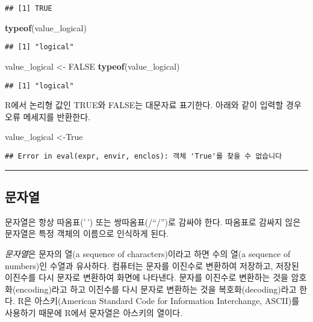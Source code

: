 \documentclass[
]{article}
\newenvironment{Shaded}{\begin{snugshade}}{\end{snugshade}}
\newcommand{\ConstantTok}[1]{\textcolor[rgb]{0.56,0.35,0.01}{#1}}
\newcommand{\FunctionTok}[1]{\textcolor[rgb]{0.13,0.29,0.53}{\textbf{#1}}}
\newcommand{\NormalTok}[1]{#1}
\newcommand{\OtherTok}[1]{\textcolor[rgb]{0.56,0.35,0.01}{#1}}
\begin{document}
\begin{verbatim}
## [1] TRUE
\end{verbatim}

\begin{Shaded}
\begin{Highlighting}[]
\FunctionTok{typeof}\NormalTok{(value\_logical)}
\end{Highlighting}
\end{Shaded}

\begin{verbatim}
## [1] "logical"
\end{verbatim}

\begin{Shaded}
\begin{Highlighting}[]
\NormalTok{value\_logical }\OtherTok{\textless{}{-}} \ConstantTok{FALSE}
\FunctionTok{typeof}\NormalTok{(value\_logical)}
\end{Highlighting}
\end{Shaded}

\begin{verbatim}
## [1] "logical"
\end{verbatim}

R에서 논리형 값인 TRUE와 FALSE는 대문자료 표기한다. 아래와 같이 입력할
경우 오류 메세지를 반환한다.

\begin{Shaded}
\begin{Highlighting}[]
\NormalTok{value\_logical }\OtherTok{\textless{}{-}}\NormalTok{True}
\end{Highlighting}
\end{Shaded}

\begin{verbatim}
## Error in eval(expr, envir, enclos): 객체 'True'를 찾을 수 없습니다
\end{verbatim}

\begin{center}\rule{0.5\linewidth}{0.5pt}\end{center}

\hypertarget{uxbb38uxc790uxc5f4}{%
\subsection{문자열}\label{uxbb38uxc790uxc5f4}}

문자열은 항상 따옴표('\,') 또는 쌍따옴표(/``/'')로 감싸야 한다. 따옴표로
감싸지 읺은 문자열은 특정 객체의 이름으로 인식하게 된다.

\emph{문자열}은 문자의 열(a sequence of characters)이라고 하면 수의 열(a
sequence of numbers)인 수열과 유사하다. 컴퓨터는 문자를 이진수로
변환하여 저장하고, 저장된 이진수를 다시 문자로 변환하여 화면에 나타낸다.
문자를 이진수로 변환하는 것을 암호화(encoding)라고 하고 이진수를 다시
문자로 변환하는 것을 복호화(decoding)라고 한다. R은 아스키(American
Standard Code for Information Interchange, ASCII)를 사용하기 때문에
R에서 문자열은 아스키의 열이다.
\end{document}
